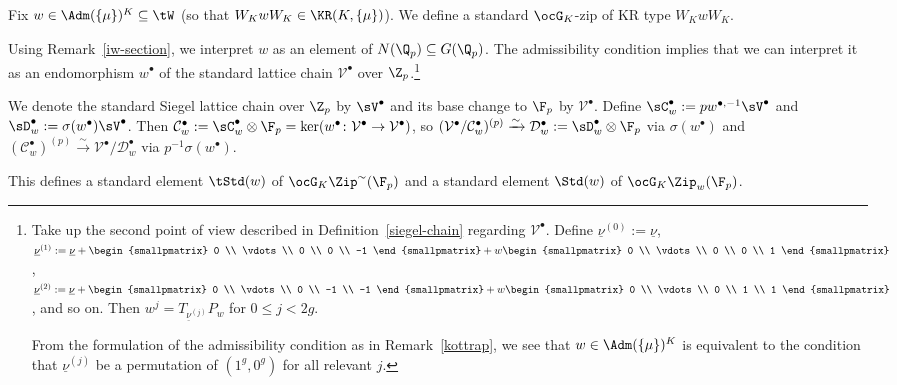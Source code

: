 \documentclass[a4paper]{scrartcl} %
\numberwithin{equation}{section}
\begin{document}
\begin{Construction}\label{std-zeug}
  Fix $w\in \Adm(\{\mu\})^K\subseteq\tW$ (so that $W_KwW_K\in\KR(K,\{\mu\})$). We define a standard $\ocG_K$-zip of KR type $W_KwW_K$.

  Using Remark~\ref{iw-section}, we interpret $w$ as an element of $N(\Q_p)\subseteq G(\Q_p)$. The admissibility condition implies that we can interpret it as an endomorphism $w^\bullet$ of the standard lattice chain $\mathcal{V}^\bullet$ over $\Z_p$.\footnote{Take up the second point of view described in Definition~\ref{siegel-chain} regarding $\mathcal{V}^\bullet$. Define $\underline{\nu}^{(0)}:=\underline{\nu}$,
  $\underline{\nu}^{(1)}:=\underline{\nu}+
  \begin{smallpmatrix}
    0 \\ \vdots \\ 0 \\ 0 \\ -1
  \end{smallpmatrix}+w
  \begin{smallpmatrix}
    0 \\ \vdots \\ 0 \\ 0 \\ 1
  \end{smallpmatrix}$,
  $\underline{\nu}^{(2)}:=\underline{\nu}+
  \begin{smallpmatrix}
    0 \\ \vdots \\ 0 \\ -1 \\ -1
  \end{smallpmatrix}+w
  \begin{smallpmatrix}
    0 \\ \vdots \\ 0 \\ 1 \\ 1
  \end{smallpmatrix}$, and so on. Then $w^j=T_{\underline{\nu}^{(j)}}P_w$ for $0\leq j<2g$.

  From the formulation of the admissibility condition as in Remark~\ref{kottrap}, we see that $w\in\Adm(\{\mu\})^K$ is equivalent to the condition that $\underline{\nu}^{(j)}$ be a permutation of $(1^g,0^g)$ for all relevant $j$.}





We denote the standard Siegel lattice chain over $\Z_p$ by $\sV^\bullet$ and its base change to $\F_p$ by $\mathcal{V}^\bullet$. Define $\sC_w^\bullet:=pw^{\bullet,-1}\sV^\bullet$ and $\sD_w^\bullet:=\sigma(w^\bullet)\sV^\bullet$. Then $\mathcal{C}_w^\bullet:=\sC_w^\bullet\otimes\F_p=\ker(w^\bullet\colon \mathcal{V}^\bullet\to \mathcal{V}^\bullet)$, so $(\mathcal{V}^\bullet/\mathcal{C}_w^\bullet)^{(p)}\xrightarrow{\sim} \mathcal{D}_w^\bullet:=\sD_w^\bullet\otimes\F_p$ via $\sigma(w^\bullet)$ and $(\mathcal{C}_w^\bullet)^{(p)}\xrightarrow{\sim} \mathcal{V}^\bullet/\mathcal{D}_w^\bullet$ via $p^{-1}\sigma(w^\bullet)$.

  This defines a standard element $\tStd(w)$ of $\ocG_K\Zip^{\sim}(\F_p)$ and a standard element $\Std(w)$ of $\ocG_K\Zip_w(\F_p)$.
\end{Construction}
\end{document}
